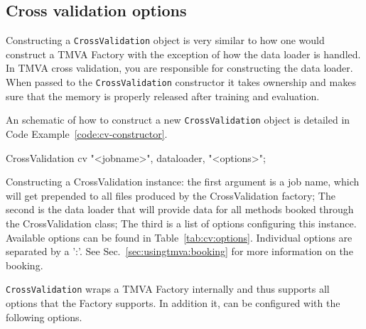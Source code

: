 \subsection{Cross validation options}

Constructing a \texttt{CrossValidation} object is very similar to how one would construct a TMVA Factory with the exception of how the data loader is handled. In TMVA cross validation, you are responsible for constructing the data loader. When passed to the \texttt{CrossValidation} constructor it takes ownership and makes sure that the memory is properly released after training and evaluation.

An schematic of how to construct a new \texttt{CrossValidation} object is detailed in Code Example~\ref{code:cv-constructor}.

\begin{codeexample}
\begin{tmvacode}
CrossValidation cv {"<jobname>", dataloader, "<options>"};
\end{tmvacode}
\caption[.]{\codeexampleCaptionSize Constructing a CrossValidation instance:
   the first argument is a job name, which will get prepended to all files
   produced by the CrossValidation factory; The second is the data loader that
   will provide data for all methods booked through the CrossValidation class;
   The third is a list of options configuring this instance. Available options
   can be found in Table~\ref{tab:cv:options}.
   Individual options are separated by a ':'. See
   Sec.~\ref{sec:usingtmva:booking} for more information on the booking.}
\label{code:cv-constructor}
\end{codeexample}

\texttt{CrossValidation} wraps a TMVA Factory internally and thus supports all options that the Factory supports. In addition it, can be configured with the following options.

